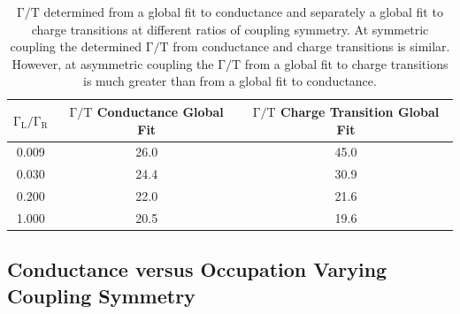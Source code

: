 \begin{table}[H]     
\centering
  \begin{tabular}{|c|c|c|}
    \hline
     $\mathrm{\Gamma_L}/\mathrm{\Gamma_R}$ & $\mathrm{\Gamma/T}$ Conductance Global Fit & $\mathrm{\Gamma/T}$ Charge Transition Global Fit\\
    \hline
    0.009 & 26.0 & 45.0\\
    0.030 & 24.4 & 30.9\\
    0.200 & 22.0 & 21.6 \\
    1.000 & 20.5 & 19.6 \\
    \hline
  \end{tabular}
 \caption[$\mathrm{\Gamma/T}$ determined from a global fit to conductance and charge transitions at different ratios of coupling symmetry.]{\label{tab:sym_coupling_gf} $\mathrm{\Gamma/T}$ determined from a global fit to conductance and separately a global fit to charge transitions at different ratios of coupling symmetry. At symmetric coupling the determined $\mathrm{\Gamma/T}$ from conductance and charge transitions is similar. However, at asymmetric coupling the $\mathrm{\Gamma/T}$  from a global fit to charge transitions is much greater than from a global fit to conductance.}
\end{table}

\afterpage{\clearpage}
\subsection{Conductance versus Occupation Varying Coupling Symmetry}



